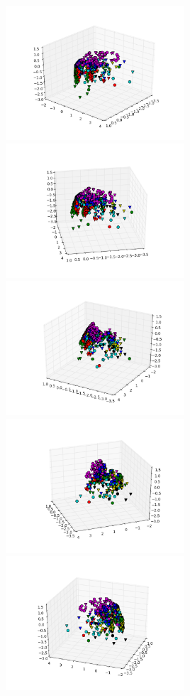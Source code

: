 \includegraphics[width=0.5\textwidth]{img/ej1_oja_005_20}
\includegraphics[width=0.5\textwidth]{img/ej1_oja_005_80}
\includegraphics[width=0.5\textwidth]{img/ej1_oja_005_120}
\includegraphics[width=0.5\textwidth]{img/ej1_oja_005_160}
\includegraphics[width=0.5\textwidth]{img/ej1_oja_005_200}
